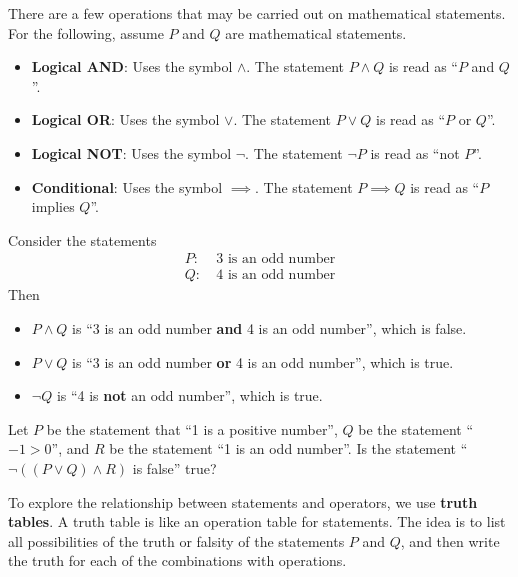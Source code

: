 There are a few operations that may be carried out on mathematical statements. For the following, assume $P$ and $Q$ are mathematical statements.
\begin{itemize}
    \item \textbf{Logical AND}: Uses the symbol $\land$. The statement $P\land Q$ is read as ``$P$ and $Q$''.
    \item \textbf{Logical OR}: Uses the symbol $\lor$. The statement $P\lor Q$ is read as ``$P$ or $Q$''.
    \item \textbf{Logical NOT}: Uses the symbol $\lnot$. The statement $\lnot P$ is read as ``not $P$''.
    \item \textbf{Conditional}: Uses the symbol $\implies$. The statement $P \implies Q$ is read as ``$P$ implies $Q$''.  
\end{itemize}
\begin{example}
    Consider the statements
    \begin{align*}
        P: &\ \text{3 is an odd number}\\
        Q: &\ \text{4 is an odd number}
    \end{align*}
    Then
    \begin{itemize}
        \item $P\land Q$ is ``3 is an odd number \textbf{and} 4 is an odd number'', which is false.
        \item $P\lor Q$ is ``3 is an odd number \textbf{or} 4 is an odd number'', which is true.
        \item $\lnot Q$ is ``4 is \textbf{not} an odd number'', which is true.
    \end{itemize}
\end{example}
\begin{exercise}
    Let $P$ be the statement that ``1 is a positive number'', $Q$ be the statement ``$-1 > 0$'', and $R$ be the statement ``1 is an odd number''. Is the statement ``$\lnot((P\lor Q)\land R)$ is false'' true?
\end{exercise}

To explore the relationship between statements and operators, we use \textbf{truth tables}. A truth table is like an operation table for statements. The idea is to list all possibilities of the truth or falsity of the statements $P$ and $Q$, and then write the truth for each of the combinations with operations.

